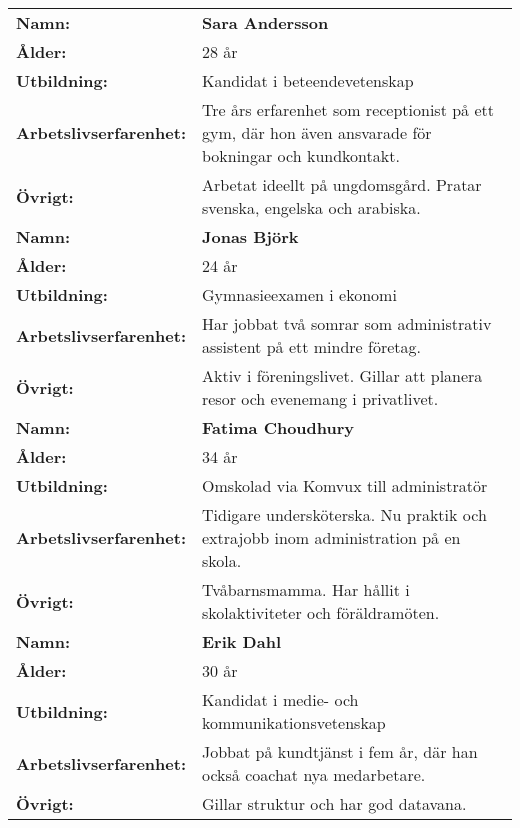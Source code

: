 \documentclass[12pt]{article}
\begin{document}
\begin{longtable}{>{\bfseries}p{2.8cm} p{9cm}}

Namn: & \textbf{Sara Andersson} \\
Ålder: & 28 år \\
Utbildning: & Kandidat i beteendevetenskap \\
Arbetslivserfarenhet: & \begin{minipage}[t]{9cm}Tre års erfarenhet som receptionist på ett gym, där hon även ansvarade för bokningar och kundkontakt.\end{minipage} \\
Övrigt: & Arbetat ideellt på ungdomsgård. Pratar svenska, engelska och arabiska. \\[1.2em]

Namn: & \textbf{Jonas Björk} \\
Ålder: & 24 år \\
Utbildning: & Gymnasieexamen i ekonomi \\
Arbetslivserfarenhet: & \begin{minipage}[t]{9cm}Har jobbat två somrar som administrativ assistent på ett mindre företag.\end{minipage} \\
Övrigt: & Aktiv i föreningslivet. Gillar att planera resor och evenemang i privatlivet. \\[1.2em]

Namn: & \textbf{Fatima Choudhury} \\
Ålder: & 34 år \\
Utbildning: & Omskolad via Komvux till administratör \\
Arbetslivserfarenhet: & \begin{minipage}[t]{9cm}Tidigare undersköterska. Nu praktik och extrajobb inom administration på en skola.\end{minipage} \\
Övrigt: & Tvåbarnsmamma. Har hållit i skolaktiviteter och föräldramöten. \\[1.2em]

Namn: & \textbf{Erik Dahl} \\
Ålder: & 30 år \\
Utbildning: & Kandidat i medie- och kommunikationsvetenskap \\
Arbetslivserfarenhet: & \begin{minipage}[t]{9cm}Jobbat på kundtjänst i fem år, där han också coachat nya medarbetare.\end{minipage} \\
Övrigt: & Gillar struktur och har god datavana. \\

\end{longtable}
\end{document}
